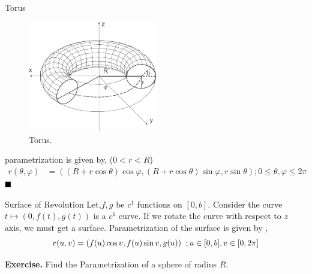\documentclass[Analysis-3]{subfiles}
\begin{document}
\begin{Eg}{Torus}{}
    
    \begin{figure}[H]
        \centering
        \includegraphics[width=0.5\textwidth]{figures/lec-24.3.png}
        \caption{Torus.}
    \end{figure}

    parametrization is given by, ($0<r<R$)
    \begin{align*}
        r(\theta , \varphi) &= ((R+r\cos \theta)\cos \varphi,(R+r\cos \theta)\sin \varphi , r \sin \theta) ; 0\le \theta , \varphi \le 2\pi 
    \end{align*} $\hfill \blacksquare$
\end{Eg}

\begin{Eg}{Surface of Revolution}{}
   Let,$f,g$ be $c^1$ functions on $[0,b]$. Consider the curve $t \mapsto (0,f(t),g(t))$ is a $c^1$ curve. If we rotate the curve with respect to $z$ axis, we must get a surface. Parametrization  of the surface is given by ,
   \[r(u,v) = (f(u)\cos v,f(u)\sin v,g(u)) \hspace{0.2cm}; u \in [0,b] , v \in [0,2\pi] \]
\end{Eg}

\hspace*{0.5cm} \textbf{Exercise.} Find the Parametrization of a sphere of radius $R$.
\end{document}
